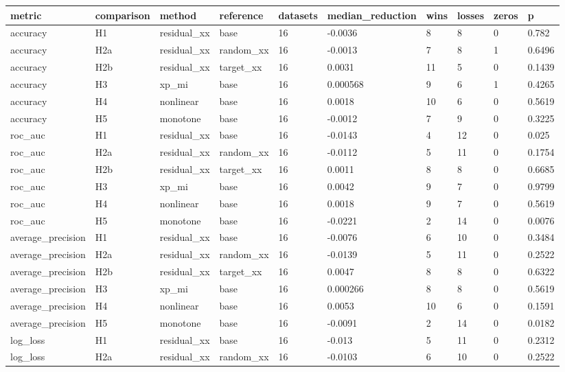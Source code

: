 \begin{tabular}{llllllllll}
\toprule
metric & comparison & method & reference & datasets & median\_reduction & wins & losses & zeros & p \\
\midrule
accuracy & H1 & residual\_xx & base & 16 & -0.0036 & 8 & 8 & 0 & 0.782 \\
accuracy & H2a & residual\_xx & random\_xx & 16 & -0.0013 & 7 & 8 & 1 & 0.6496 \\
accuracy & H2b & residual\_xx & target\_xx & 16 & 0.0031 & 11 & 5 & 0 & 0.1439 \\
accuracy & H3 & xp\_mi & base & 16 & 0.000568 & 9 & 6 & 1 & 0.4265 \\
accuracy & H4 & nonlinear & base & 16 & 0.0018 & 10 & 6 & 0 & 0.5619 \\
accuracy & H5 & monotone & base & 16 & -0.0012 & 7 & 9 & 0 & 0.3225 \\
roc\_auc & H1 & residual\_xx & base & 16 & -0.0143 & 4 & 12 & 0 & 0.025 \\
roc\_auc & H2a & residual\_xx & random\_xx & 16 & -0.0112 & 5 & 11 & 0 & 0.1754 \\
roc\_auc & H2b & residual\_xx & target\_xx & 16 & 0.0011 & 8 & 8 & 0 & 0.6685 \\
roc\_auc & H3 & xp\_mi & base & 16 & 0.0042 & 9 & 7 & 0 & 0.9799 \\
roc\_auc & H4 & nonlinear & base & 16 & 0.0018 & 9 & 7 & 0 & 0.5619 \\
roc\_auc & H5 & monotone & base & 16 & -0.0221 & 2 & 14 & 0 & 0.0076 \\
average\_precision & H1 & residual\_xx & base & 16 & -0.0076 & 6 & 10 & 0 & 0.3484 \\
average\_precision & H2a & residual\_xx & random\_xx & 16 & -0.0139 & 5 & 11 & 0 & 0.2522 \\
average\_precision & H2b & residual\_xx & target\_xx & 16 & 0.0047 & 8 & 8 & 0 & 0.6322 \\
average\_precision & H3 & xp\_mi & base & 16 & 0.000266 & 8 & 8 & 0 & 0.5619 \\
average\_precision & H4 & nonlinear & base & 16 & 0.0053 & 10 & 6 & 0 & 0.1591 \\
average\_precision & H5 & monotone & base & 16 & -0.0091 & 2 & 14 & 0 & 0.0182 \\
log\_loss & H1 & residual\_xx & base & 16 & -0.013 & 5 & 11 & 0 & 0.2312 \\
log\_loss & H2a & residual\_xx & random\_xx & 16 & -0.0103 & 6 & 10 & 0 & 0.2522 \\

\end{tabular}
